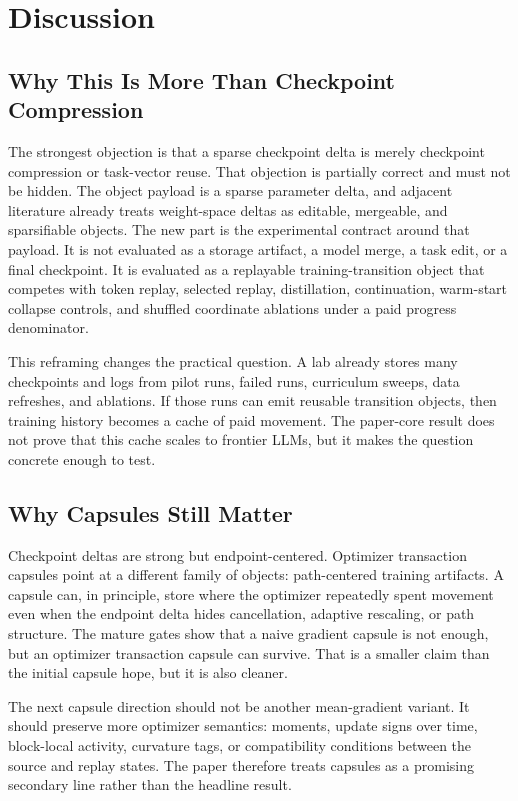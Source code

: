 \documentclass{article}
\begin{document}
\section{Discussion}

\subsection{Why This Is More Than Checkpoint Compression}

The strongest objection is that a sparse checkpoint delta is merely checkpoint
compression or task-vector reuse. That objection is partially correct and must
not be hidden. The object payload is a sparse parameter delta, and adjacent
literature already treats weight-space deltas as editable, mergeable, and
sparsifiable objects. The new part is the experimental contract around that
payload. It is not evaluated as a storage artifact, a model merge, a task edit,
or a final checkpoint. It is evaluated as a replayable training-transition
object that competes with token replay, selected replay, distillation,
continuation, warm-start collapse controls, and shuffled coordinate ablations
under a paid progress denominator.

This reframing changes the practical question. A lab already stores many
checkpoints and logs from pilot runs, failed runs, curriculum sweeps, data
refreshes, and ablations. If those runs can emit reusable transition objects,
then training history becomes a cache of paid movement. The paper-core result
does not prove that this cache scales to frontier LLMs, but it makes the
question concrete enough to test.

\subsection{Why Capsules Still Matter}

Checkpoint deltas are strong but endpoint-centered. Optimizer transaction
capsules point at a different family of objects: path-centered training
artifacts. A capsule can, in principle, store where the optimizer repeatedly
spent movement even when the endpoint delta hides cancellation, adaptive
rescaling, or path structure. The mature gates show that a naive gradient
capsule is not enough, but an optimizer transaction capsule can survive. That
is a smaller claim than the initial capsule hope, but it is also cleaner.

The next capsule direction should not be another mean-gradient variant. It
should preserve more optimizer semantics: moments, update signs over time,
block-local activity, curvature tags, or compatibility conditions between the
source and replay states. The paper therefore treats capsules as a promising
secondary line rather than the headline result.
\end{document}
